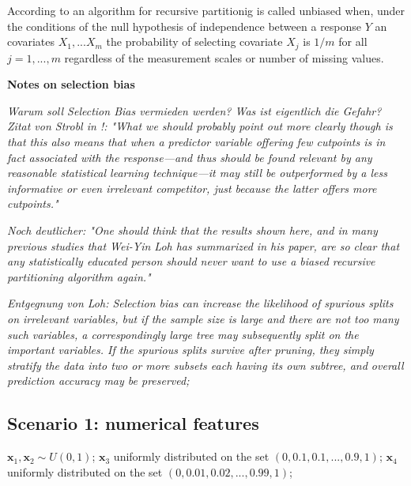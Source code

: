 



According to \citep{Hothorn.2006} an algorithm for recursive partitionig is called unbiased when, under the conditions of the null hypothesis of independence between a response $Y$ an covariates $X_{1},...X_{m}$ the probability of selecting covariate $X_{j}$ is $1/m$ for all $j = 1,...,m$ regardless of the measurement scales or number of missing values. 

\vspace{1cm}

\textbf{Notes on selection bias}

\textit{Warum soll Selection Bias vermieden werden? Was ist eigentlich die Gefahr? 
Zitat von Strobl in \citep{Loh.2014}!: "What we should probably point out more clearly though is that this also means that when
a predictor variable offering few cutpoints is in fact associated with the response—and thus
should be found relevant by any reasonable statistical learning technique—it may still be outperformed by a less informative or even irrelevant competitor, just because the latter offers more cutpoints."}

\textit{Noch deutlicher: "One should think that the results shown here, and in many previous studies that Wei-Yin Loh has summarized in his paper, are so clear that any statistically educated person should never
want to use a biased recursive partitioning algorithm again."}

\textit{Entgegnung von Loh: Selection bias can increase the likelihood of spurious splits on irrelevant variables,
but if the sample size is large and there are not too many such variables, a correspondingly
large tree may subsequently split on the important variables. If the spurious splits survive after
pruning, they simply stratify the data into two or more subsets each having its own subtree, and
overall prediction accuracy may be preserved;}






\vspace{1cm}




\subsection{Scenario 1: numerical features}
$\textbf{x}_{1}, \textbf{x}_{2} \sim U(0,1)$; 
$\textbf{x}_{3}$ uniformly distributed on the set $(0, 0.1, 0.1,..., 0.9, 1)$;
$\textbf{x}_{4}$ uniformly distributed on the set $(0, 0.01, 0.02,..., 0.99, 1)$;
   
